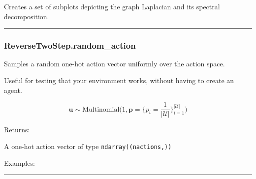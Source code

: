 \begin{Shaded}
\begin{Highlighting}[]
\OperatorTok{=}\OperatorTok{=}\OperatorTok{=}\NormalTok{)}
\end{Highlighting}
\end{Shaded}

Creates a set of subplots depicting the graph Laplacian and its spectral
decomposition.

\begin{center}\rule{0.5\linewidth}{\linethickness}\end{center}

\hypertarget{reversetwostep.random_action}{%
\subsubsection{ReverseTwoStep.random\_action}\label{reversetwostep.random_action}}

\begin{Shaded}
\begin{Highlighting}[]
\NormalTok{)}
\end{Highlighting}
\end{Shaded}

Samples a random one-hot action vector uniformly over the action space.

Useful for testing that your environment works, without having to create
an agent.

\[
\mathbf u \sim \mathrm{Multinomial}\Big(1, \mathbf p=\{p_i = \frac{1}{|\mathcal U|}\}_{i=1}^{|\mathcal U|}\Big)
\]

Returns:

A one-hot action vector of type \texttt{ndarray((nactions,))}

Examples:

\begin{Shaded}
\begin{Highlighting}[]
\OperatorTok{=}
\end{Highlighting}
\end{Shaded}

\begin{center}\rule{0.5\linewidth}{\linethickness}\end{center}

